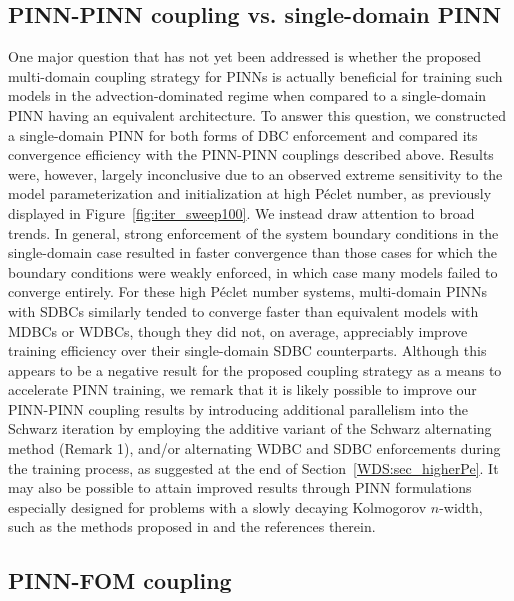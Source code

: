\documentclass[oneside,final]{csri23}
\begin{document}
\subsection{PINN-PINN coupling vs. single-domain PINN} \label{WDS:sec_singleDomainPINN}
One major question that has not yet been addressed is whether the proposed multi-domain coupling strategy for PINNs is actually beneficial for training such models in the advection-dominated regime when compared to a single-domain PINN having an equivalent architecture. To answer this question, we constructed a single-domain PINN for both forms of DBC enforcement and compared its convergence efficiency with the PINN-PINN couplings described above. Results were, however, largely inconclusive due to an observed extreme sensitivity to the model parameterization and initialization at high P\'{e}clet number, as previously displayed in Figure~\ref{fig:iter_sweep100}. We instead draw attention to broad trends. In general, strong enforcement of the system boundary conditions in the single-domain case resulted in faster convergence than those cases for which the boundary conditions were weakly enforced, in which case many models failed to converge entirely. For these high P\'{e}clet number systems, multi-domain PINNs with SDBCs similarly tended to converge faster than equivalent models with MDBCs or WDBCs, though they did not, on average, appreciably improve training efficiency over their single-domain SDBC counterparts. Although this appears to be a negative result for the proposed coupling strategy as a means to accelerate PINN training, we remark that it is likely possible to improve our PINN-PINN coupling results by introducing additional parallelism into the Schwarz iteration by employing the additive variant of the Schwarz alternating method (Remark 1), and/or alternating WDBC and SDBC enforcements during the training process, as suggested at the end of Section~\ref{WDS:sec_higherPe}. It may also be possible to attain improved results through PINN formulations especially designed for problems with a slowly decaying Kolmogorov $n$-width, such as the methods proposed in \cite{WDS:Mojgani:2023} and the references therein.

\subsection{PINN-FOM coupling} \label{WDS:sec_PINN-FOM}
\end{document}
